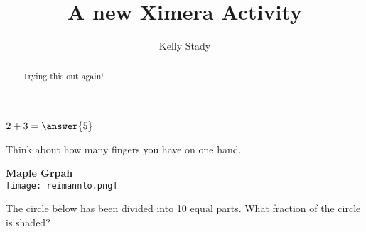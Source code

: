 \documentclass[handout]{ximera}
\title{A new Ximera Activity}
\author{Kelly Stady}
\begin{document}
\begin{abstract}
    Trying this out again!
\end{abstract}
\maketitle



\begin{question}
    $2+3=\answer{5}$

\begin{hint}  %
Think about how many fingers you have on one hand.
\end{hint}

\end{question}




\begin{center} %
\textbf{Maple Grpah} \\

    \texttt{[image: reimannlo.png]}
\end{center}


\begin{question}
 The circle below has been divided into 10 equal parts.  What fraction of the circle is shaded? \\ \\


\begin{center} 
\hspace{0.8in} 
\end{center}

\begin{multipleChoice}
\end{multipleChoice}

\end{question}
\end{document}
